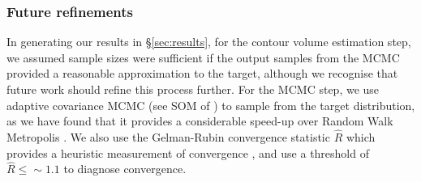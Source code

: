 \subsubsection{Future refinements}
In generating our results in \S\ref{sec:results}, for the contour volume estimation step, we assumed sample sizes were sufficient if the output samples from the MCMC provided a reasonable approximation to the target, although we recognise that future work should refine this process further. For the MCMC step, we use adaptive covariance MCMC (see SOM of \cite{johnstone2016uncertainty}) to sample from the target distribution, as we have found that it provides a considerable speed-up over Random Walk Metropolis \cite{metropolis1953equation,lambert2018Student}. We also use the Gelman-Rubin convergence statistic $\hat{R}$ which provides a heuristic measurement of convergence \cite{lambert2018Student,gelman1992inference}, and use a threshold of $\hat{R}\leq\sim 1.1$ to diagnose convergence.
